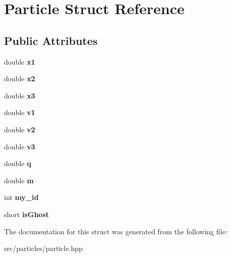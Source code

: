 \hypertarget{struct_particle}{}\section{Particle Struct Reference}
\label{struct_particle}
\subsection*{Public Attributes}
\begin{DoxyCompactItemize}
\item 
\hypertarget{struct_particle_ad565762c5789038a38b77b8b7b73108e}{}\label{struct_particle_ad565762c5789038a38b77b8b7b73108e} 
double {\bfseries x1}
\item 
\hypertarget{struct_particle_a4c6d32080244942982cddb6c6908ee5d}{}\label{struct_particle_a4c6d32080244942982cddb6c6908ee5d} 
double {\bfseries x2}
\item 
\hypertarget{struct_particle_a252ebc476e3bdf3deb799de97b55c136}{}\label{struct_particle_a252ebc476e3bdf3deb799de97b55c136} 
double {\bfseries x3}
\item 
\hypertarget{struct_particle_a50d359033a629a9004251ae121f104a3}{}\label{struct_particle_a50d359033a629a9004251ae121f104a3} 
double {\bfseries v1}
\item 
\hypertarget{struct_particle_afbd6500ae530cee3449acea407196faa}{}\label{struct_particle_afbd6500ae530cee3449acea407196faa} 
double {\bfseries v2}
\item 
\hypertarget{struct_particle_a70a3e519b0d00c7a34c7bcd8ad3f0934}{}\label{struct_particle_a70a3e519b0d00c7a34c7bcd8ad3f0934} 
double {\bfseries v3}
\item 
\hypertarget{struct_particle_a566dcc1de4bdc01251776948798ea8e1}{}\label{struct_particle_a566dcc1de4bdc01251776948798ea8e1} 
double {\bfseries q}
\item 
\hypertarget{struct_particle_aedcc7e1bc53b0e2b1a4a07c9a1b47563}{}\label{struct_particle_aedcc7e1bc53b0e2b1a4a07c9a1b47563} 
double {\bfseries m}
\item 
\hypertarget{struct_particle_a8c5aa296be47df7d6bbfe3a3f602f3d5}{}\label{struct_particle_a8c5aa296be47df7d6bbfe3a3f602f3d5} 
int {\bfseries my\+\_\+id}
\item 
\hypertarget{struct_particle_a2e15a24415109ae666abf197c6c0e7f8}{}\label{struct_particle_a2e15a24415109ae666abf197c6c0e7f8} 
short {\bfseries is\+Ghost}
\end{DoxyCompactItemize}


The documentation for this struct was generated from the following file\+:\begin{DoxyCompactItemize}
\item 
src/particles/particle.\+hpp\end{DoxyCompactItemize}

